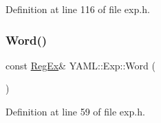 Definition at line 116 of file exp.\+h.

\mbox{\label{namespace_y_a_m_l_1_1_exp_af1b8edcfdbd528cef70b14f21c5e2ec6}} 
\subsubsection{\texorpdfstring{Word()}{Word()}}
{\footnotesize\ttfamily const \mbox{\hyperlink{class_y_a_m_l_1_1_reg_ex}{Reg\+Ex}}\& Y\+A\+M\+L\+::\+Exp\+::\+Word (\begin{DoxyParamCaption}{ }\end{DoxyParamCaption})\hspace{0.3cm}{\ttfamily [inline]}}



Definition at line 59 of file exp.\+h.

